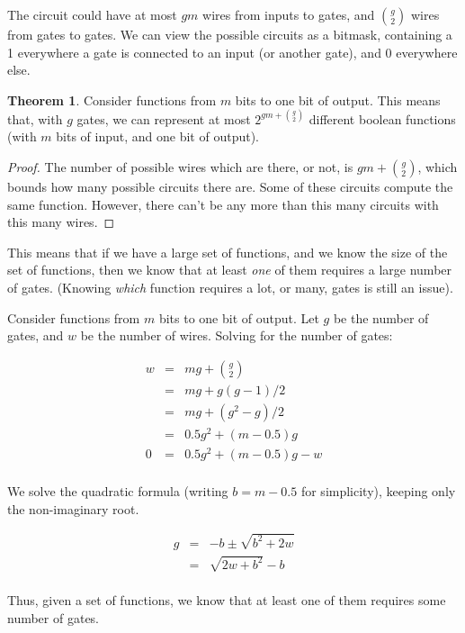 \documentclass[12pt]{article}
\theoremstyle{definition}
\newtheorem{thm}{Theorem}[section]
\begin{document}
The
circuit could have at most $gm$ wires from inputs to gates, and ${g \choose 2}$
wires from gates to gates. We can view the possible circuits as a bitmask,
containing a 1 everywhere a gate is connected to an input (or another gate),
and 0 everywhere else.

\begin{thm}
\label{boundFromCounting}
Consider functions from $m$ bits to one bit of output.
This means that, with $g$ gates, we can represent at most
$2^{gm + {g \choose 2}}$ different boolean functions (with $m$ bits of input,
and one bit of output).
\end{thm}
\begin{proof}

The number of possible wires which are there, or not, is $gm + {g \choose 2}$,
which bounds how many possible circuits there are.
Some of these circuits compute the same function.
However, there can't be any more than this many circuits with this many wires.
\end{proof}

This means that if we have a large set of functions, and we know the size of
the set of functions, then we know that at least {\em one} of them requires
a large number of gates. (Knowing {\em which} function requires a lot, or many,
gates is still an issue).

Consider functions from $m$ bits to one bit of output.
Let $g$ be the number of gates, and $w$ be the number of wires.
Solving for the number of gates:

\begin{eqnarray*}
w & = & mg + {g \choose 2} \\
  & = & mg + g(g-1)/2 \\
  & = & mg + (g^2 - g) / 2 \\
  & = & 0.5g^2 + (m-0.5)g \\
0 & = & 0.5g^2 + (m-0.5)g - w \\
\end{eqnarray*}

We solve the quadratic formula (writing $b = m-0.5$ for simplicity), keeping
only the non-imaginary root.

\begin{eqnarray*}
g & = & -b \pm \sqrt{ b^2 + 2w} \\
  & = & {\sqrt {2w + b^2}} - b \\
\end{eqnarray*}

Thus, given a set of functions, we know that at least one of them requires
some number of gates.
\end{document}
